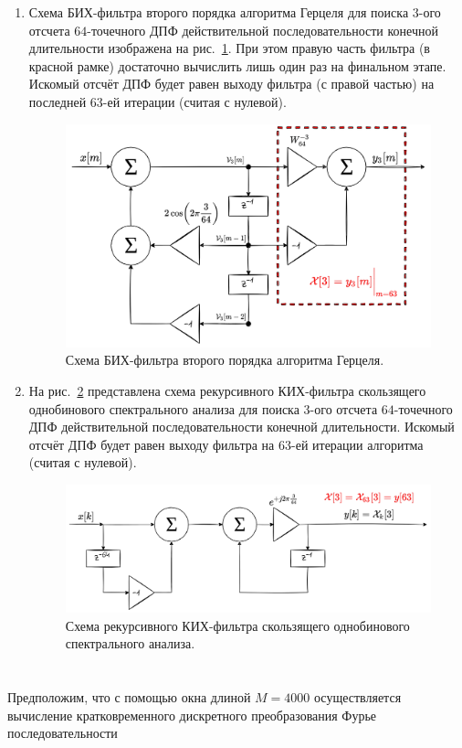 \begin{enumerate}[label=(\alph*)]
	\item Схема БИХ-фильтра второго порядка алгоритма Герцеля для поиска $3$-ого отсчета $64$-точечного ДПФ действительной последовательности конечной длительности изображена на рис.~\ref{fig:4-2-1}. При этом правую часть фильтра (в красной рамке) достаточно вычислить лишь один раз на финальном этапе. Искомый отсчёт ДПФ будет равен выходу фильтра (с правой частью) на последней $63$-ей итерации (считая с нулевой).
	
	\begin{figure}[!h]
		\centering
		\includegraphics[width=0.65\columnwidth]{pics/spring/4/2-1.png}
		\caption{Схема БИХ-фильтра второго порядка алгоритма Герцеля.}
		\label{fig:4-2-1}
	\end{figure}
	
	
	\item На рис.~\ref{fig:4-2-2} представлена схема рекурсивного КИХ-фильтра скользящего однобинового спектрального анализа для поиска $3$-ого отсчета $64$-точечного ДПФ действительной последовательности конечной длительности.
	Искомый отсчёт ДПФ будет равен выходу фильтра на $63$-ей итерации алгоритма (считая с нулевой).
	\begin{figure}[!h]
		\centering
		\includegraphics[width=0.65\columnwidth]{pics/spring/4/2-2.png}
		\caption{Схема рекурсивного КИХ-фильтра скользящего однобинового спектрального анализа.}
		\label{fig:4-2-2}
	\end{figure}
	
\end{enumerate}


\newpage
\section{}
Предположим, что с помощью окна длиной $M = 4000$ осуществляется вычисление кратковременного дискретного преобразования Фурье последовательности

